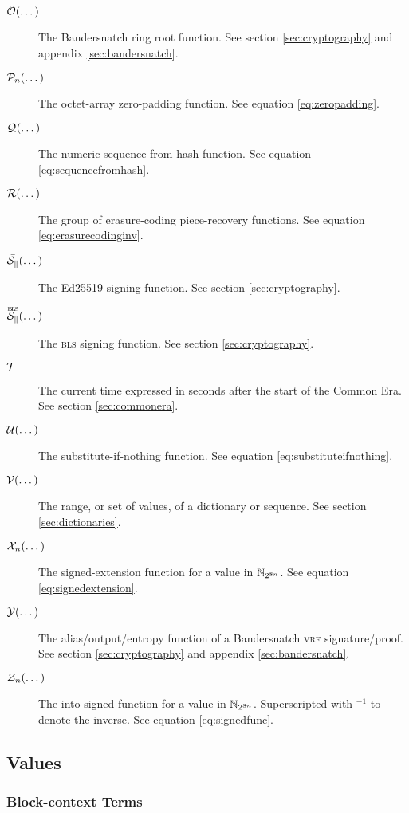 \begin{description}
  \item[$\getringroot{\dots}$] The Bandersnatch ring root function. See section \ref{sec:cryptography} and appendix \ref{sec:bandersnatch}.
  \item[$\zeropad{n}{\dots}$] The octet-array zero-padding function. See equation \ref{eq:zeropadding}.
  \item[$\seqfromhash{}{\dots}$] The numeric-sequence-from-hash function. See equation \ref{eq:sequencefromhash}.
  \item[$\ecrecover{\dots}$] The group of erasure-coding piece-recovery functions. See equation \ref{eq:erasurecodinginv}.
  \item[$\edsigndata{k}{\dots}$] The Ed25519 signing function. See section \ref{sec:cryptography}.
  \item[$\blssigndata{k}{\dots}$] The \textsc{bls} signing function. See section \ref{sec:cryptography}.
  \item[$\mathcal{T}$] The current time expressed in seconds after the start of the \Jam Common Era. See section \ref{sec:commonera}.
  \item[$\subifnone{\dots}$] The substitute-if-nothing function. See equation \ref{eq:substituteifnothing}.
  \item[$\values{\dots}$] The range, or set of values, of a dictionary or sequence. See section \ref{sec:dictionaries}.
  \item[$\sext{n}{\dots}$] The signed-extension function for a value in $\mathbb{N}_{2^{8n}}$. See equation \ref{eq:signedextension}.
  \item[$\banderout{\dots}$] The alias/output/entropy function of a Bandersnatch \textsc{vrf} signature/proof. See section \ref{sec:cryptography} and appendix \ref{sec:bandersnatch}.
  \item[$\mathcal{Z}_{n}(\dots)$] The into-signed function for a value in $\mathbb{N}_{2^{8n}}$. Superscripted with ${}^{-1}$ to denote the inverse. See equation \ref{eq:signedfunc}.
\end{description}

\subsection{Values}

\subsubsection{Block-context Terms}

